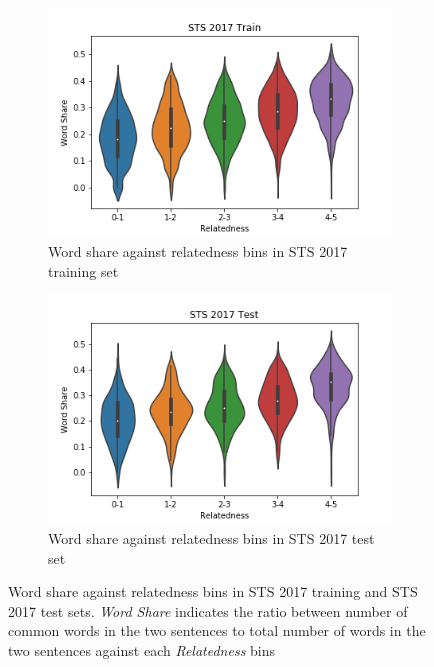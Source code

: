\begin{enumerate}
\begin{figure}
	\captionsetup[subfigure]{justification=centering}
	\centering
	\begin{subfigure}[b]{.5\textwidth}
		\centering
		\includegraphics[width=\textwidth]{figures/semantic_textual_similarity/introduction/sts_2017_train_word_share.png}
		\caption{Word share against relatedness bins in STS 2017 training set}
		\label{fig:sts_train_word_share}
	\end{subfigure}%
	\begin{subfigure}[b]{.5\textwidth}
		\centering
		\includegraphics[width=\textwidth]{figures/semantic_textual_similarity/introduction/sts_2017_test_word_share.png}
		\caption{Word share against relatedness bins in STS 2017 test set}
		\label{fig:sts_test_word_share}
	\end{subfigure}
	\caption[Word share against relatedness bins in STS 2017 training and STS 2017 test sets.]{Word share against relatedness bins in STS 2017 training and STS 2017 test sets. \textit{Word Share} indicates the ratio between number of common words in the two sentences to total number of words in the two sentences against each \textit{Relatedness} bins}
	\label{fig:sts_word_share}
\end{figure}



\end{enumerate}
